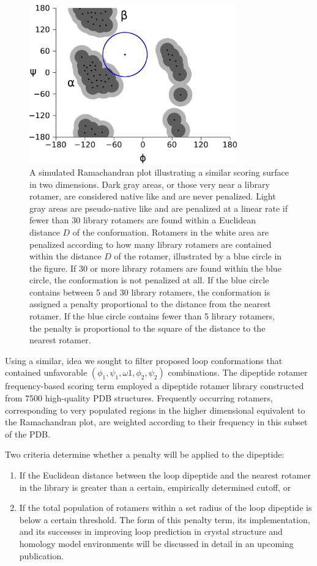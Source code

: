 \begin{figure}[h]
    \centering
    \includegraphics[width=0.8\textwidth,height=0.5\textheight,keepaspectratio]{figures/rfs_ex.png}
    \caption{A simulated Ramachandran plot illustrating a similar scoring surface in two dimensions.
Dark gray areas, or those very near a library rotamer, are considered native like and are never penalized.
Light gray areas are pseudo-native like and are penalized at a linear rate if fewer than 30 library rotamers are found within a Euclidean distance $D$ of the conformation.
Rotamers in the white area are penalized according to how many library rotamers are contained within the distance $D$ of the rotamer, illustrated by a blue circle in the figure.
If 30 or more library rotamers are found within the blue circle, the conformation is not penalized at all.
If the blue circle contains between 5 and 30 library rotamers, the conformation is assigned a penalty proportional to the distance from the nearest rotamer.
If the blue circle contains fewer than 5 library rotamers, the penalty is proportional to the square of the distance to the nearest rotamer.}
    \label{figure:rfs_plot}
\end{figure}

Using a similar, idea we sought to filter proposed loop conformations that contained unfavorable $(\phi_{1}, \psi_{1}, \omega{1}, \phi_{2}, \psi_{2})$ combinations.
The dipeptide rotamer frequency-based scoring term employed a dipeptide rotamer library constructed from {\textapprox}7500 high-quality PDB structures.
Frequently occurring rotamers, corresponding to very populated regions in the higher dimensional equivalent to the Ramachandran plot, are weighted according to their frequency in this subset of the PDB.

Two criteria determine whether a penalty will be applied to the dipeptide: 
\begin{enumerate}
\item If the Euclidean distance between the loop dipeptide and the nearest rotamer in the library is greater than a certain, empirically determined cutoff, or
\item If the total population of rotamers within a set radius of the loop dipeptide is below a certain threshold.
The form of this penalty term, its implementation, and its successes in improving loop prediction in crystal structure and homology model environments will be discussed in detail in an upcoming publication.
\end{enumerate}

